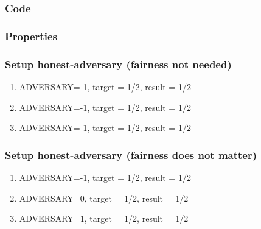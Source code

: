 \documentclass{article}
\begin{document}
\subsubsection{Code}



\subsubsection{Properties}




\subsubsection{Setup honest-adversary (fairness not needed)}

\begin{enumerate}
\item ADVERSARY=-1, target = 1/2, result = 1/2
\item ADVERSARY=-1, target = 1/2, result = 1/2
\item ADVERSARY=-1, target = 1/2, result = 1/2
\end{enumerate}

\subsubsection{Setup honest-adversary (fairness does not matter)}

\begin{enumerate}
\item ADVERSARY=-1, target = 1/2, result = 1/2
\item ADVERSARY=0, target = 1/2, result = 1/2
\item ADVERSARY=1, target = 1/2, result = 1/2
\end{enumerate}
\end{document}
